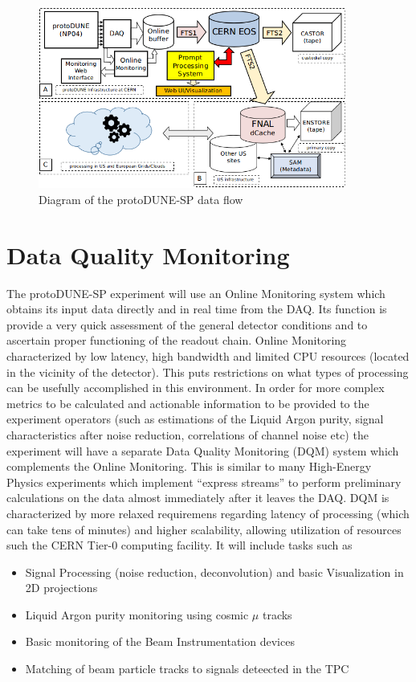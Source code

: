 \documentclass{webofc}
\newcommand{\pd}{protoDUNE\xspace}
\begin{document}
\begin{figure}[tb]
\centering\includegraphics[width=0.9\textwidth]{figures/protoDUNE_data_flow_2018_v1.png}
\caption{\label{fig:dataflow}Diagram of the protoDUNE-SP data flow}
\end{figure}



\section{Data Quality Monitoring}
The protoDUNE-SP experiment will use an Online Monitoring system which obtains its input data directly
and in real time from the DAQ.
 Its function is provide a very quick assessment of the general detector conditions
and to ascertain proper functioning of the readout chain. Online Monitoring characterized by low latency, high bandwidth
and limited CPU resources (located in the vicinity of the detector). This puts restrictions on what types of processing
can be usefully accomplished in this environment.
In order for more complex metrics to be calculated and actionable information to be provided to the experiment operators
(such as estimations of the Liquid Argon purity, signal characteristics after noise reduction, correlations of channel noise etc) 
the experiment will have a separate Data Quality Monitoring (DQM) system which complements the Online Monitoring.
This is similar to many High-Energy Physics experiments which implement ``express streams'' to perform
preliminary calculations on the data almost immediately after it leaves the DAQ. DQM is characterized by more relaxed
requiremens regarding latency of processing (which can take tens of minutes) and higher scalability, allowing
utilization of resources such the CERN Tier-0 computing facility.
It will include tasks such as
\begin{itemize}
\item Signal Processing (noise reduction, deconvolution) and basic Visualization in 2D projections
\item Liquid Argon purity monitoring using cosmic $\mu$ tracks
\item Basic monitoring of the Beam Instrumentation devices
\item Matching of beam particle tracks to signals deteected in the TPC
\end{itemize}
\end{document}
